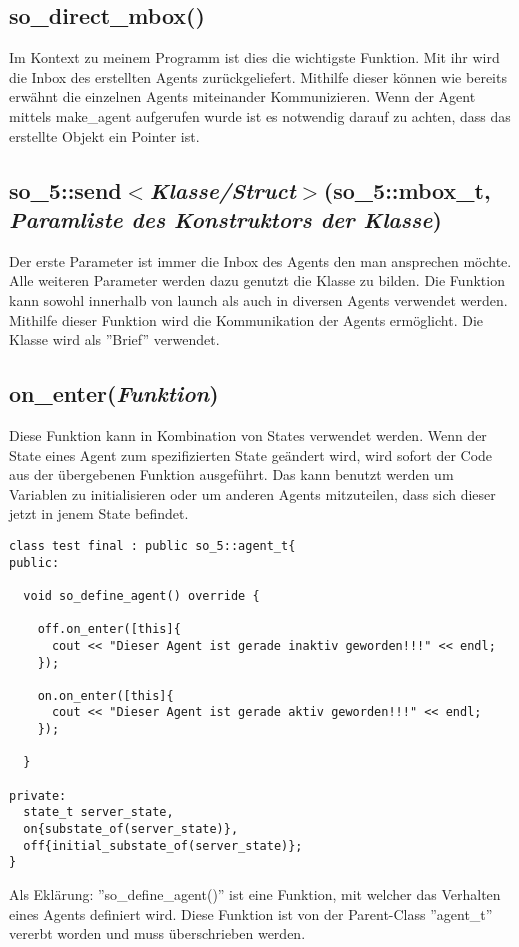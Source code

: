 \subsection{so\_direct\_mbox()}
Im Kontext zu meinem Programm ist dies die wichtigste Funktion. Mit ihr wird die Inbox des erstellten Agents
zurückgeliefert. Mithilfe dieser können wie bereits erwähnt die einzelnen Agents miteinander Kommunizieren.
Wenn der Agent mittels make\_agent aufgerufen wurde ist es notwendig darauf zu achten, dass das erstellte Objekt
ein Pointer ist.

\subsection{so\_5::send$<$\textit{Klasse/Struct}$>$(so\_5::mbox\_t, \textit{Paramliste des Konstruktors der Klasse})}
Der erste Parameter ist immer die Inbox des Agents den man ansprechen möchte. Alle weiteren Parameter werden
dazu genutzt die Klasse zu bilden. Die Funktion kann sowohl innerhalb von launch als auch in diversen Agents
verwendet werden. Mithilfe dieser Funktion wird die Kommunikation der Agents ermöglicht. Die Klasse wird als
''Brief'' verwendet.

\subsection{on\_enter(\textit{Funktion})}
Diese Funktion kann in Kombination von States verwendet werden. Wenn der State eines Agent zum spezifizierten State
geändert wird, wird sofort der Code aus der übergebenen Funktion ausgeführt. Das kann benutzt werden um Variablen zu
initialisieren oder um anderen Agents mitzuteilen, dass sich dieser jetzt in jenem State befindet.

\begin{verbatim}
class test final : public so_5::agent_t{
public:

  void so_define_agent() override {
  
    off.on_enter([this]{
      cout << "Dieser Agent ist gerade inaktiv geworden!!!" << endl;
    });
    
    on.on_enter([this]{
      cout << "Dieser Agent ist gerade aktiv geworden!!!" << endl;
    });
  
  }

private:
  state_t server_state,
  on{substate_of(server_state)},
  off{initial_substate_of(server_state)};
}
\end{verbatim}

Als Eklärung: ''so\_define\_agent()'' ist eine Funktion, mit welcher das Verhalten eines
Agents definiert wird. Diese Funktion ist von der Parent-Class ''agent\_t'' vererbt worden
und muss überschrieben werden.

